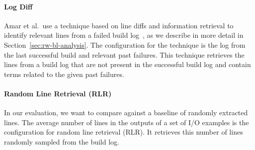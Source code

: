 \documentclass[\myrootdir/main.tex]{subfiles}
\begin{document}
\paragraph{Log Diff}
Amar et al.\ use a technique based on line diffs and information retrieval to identify relevant lines from a failed build log~\cite{amar2019mining}, as we describe in more detail in Section~\ref{sec:rw-bl-analysis}.
The configuration for the technique is the log from the last successful build and relevant past failures.
This technique retrieves the lines from a build log that are not present in the successful build log and contain terms related to the given past failures.
\paragraph{Random Line Retrieval (RLR)}
In our evaluation, we want to compare against a baseline of randomly extracted lines.
The average number of lines in the outputs of a set of I/O examples is the configuration for random line retrieval (RLR).
It retrieves this number of lines randomly sampled from the build log.
\end{document}
